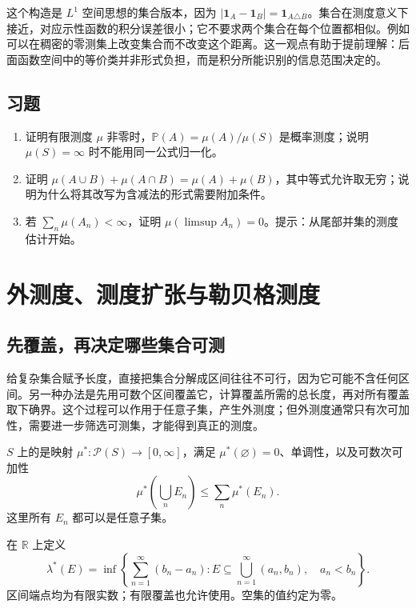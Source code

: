\documentclass[UTF8,12pt,a4paper,fontset=fandol]{ctexbook}
\begin{document}
这个构造是 $L^1$ 空间思想的集合版本，因为
$|\mathbf1_A-\mathbf1_B|=\mathbf1_{A\triangle B}$。集合在测度意义下接近，对应示性函数的积分误差很小；它不要求两个集合在每个位置都相似。例如可以在稠密的零测集上改变集合而不改变这个距离。这一观点有助于提前理解：后面函数空间中的等价类并非形式负担，而是积分所能识别的信息范围决定的。

\section{习题}
\begin{enumerate}
 \item 证明有限测度 $\mu$ 非零时，$\mathbb P(A)=\mu(A)/\mu(S)$ 是概率测度；说明 $\mu(S)=\infty$ 时不能用同一公式归一化。
 \item 证明 $\mu(A\cup B)+\mu(A\cap B)=\mu(A)+\mu(B)$，其中等式允许取无穷；说明为什么将其改写为含减法的形式需要附加条件。
 \item 若 $\sum_n\mu(A_n)<\infty$，证明 $\mu(\limsup A_n)=0$。提示：从尾部并集的测度估计开始。
\end{enumerate}

\chapter{外测度、测度扩张与勒贝格测度}
\label{chap:mt-construction}

\section{先覆盖，再决定哪些集合可测}
给复杂集合赋予长度，直接把集合分解成区间往往不可行，因为它可能不含任何区间。另一种办法是先用可数个区间覆盖它，计算覆盖所需的总长度，再对所有覆盖取下确界。这个过程可以作用于任意子集，产生外测度；但外测度通常只有次可加性，需要进一步筛选可测集，才能得到真正的测度。

\begin{definition}
$S$ 上的是映射 $\mu^*:\mathcal P(S)\to[0,\infty]$，满足 $\mu^*(\varnothing)=0$、单调性，以及可数次可加性
\[
 \mu^*\!\left(\bigcup_nE_n\right)\leq\sum_n\mu^*(E_n).
\]
这里所有 $E_n$ 都可以是任意子集。
\end{definition}

在 $\mathbb R$ 上定义
\begin{equation}
 \lambda^*(E)=\inf\left\{\sum_{n=1}^{\infty}(b_n-a_n):
 E\subseteq\bigcup_{n=1}^{\infty}(a_n,b_n),\quad a_n<b_n\right\}.
 \label{eq:mt-lebesgue-outer}
\end{equation}
区间端点均为有限实数；有限覆盖也允许使用。空集的值约定为零。
\end{document}
